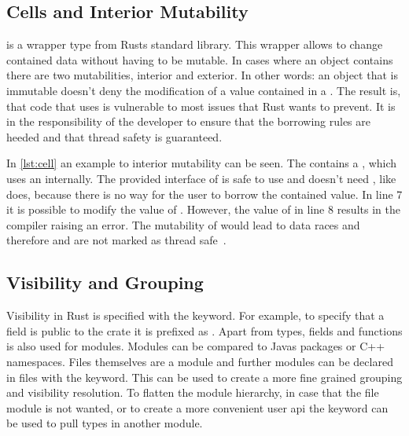 \documentclass[thesis]{subfiles}
\begin{document}
  \subsection{Cells and Interior Mutability}\label{sec:cell}
    \UnsafeCellT is a wrapper type from Rusts standard library.
    This wrapper allows to change contained data without having to be mutable.
    In cases where an object contains \UnsafeCellT there are two mutabilities, interior and exterior.
    In other words: an object that is immutable doesn't deny the modification of a value contained in a \UnsafeCellT.
    The result is, that code that uses \UnsafeCellT is vulnerable to most issues that Rust wants to prevent.
    It is in the responsibility of the developer to ensure that the borrowing rules are heeded and that thread safety is guaranteed.%
    ~\autocite[std::cell]{rust-doc}


    In \autoref{lst:cell} an example to interior mutability can be seen.
    The \struct \Foo contains a \CellT, which uses an \UnsafeCellT internally.
    The provided interface of \CellT is safe to use and doesn't need \unsafe, like \UnsafeCellT does, because there is no way for the user to borrow the contained value.
    In line 7 it is possible to modify the value of \x.
    However, the value of \y in line 8 results in the compiler raising an error.
    The mutability of \x would lead to data races and therefore \CellT and \RefCellT are not marked as thread safe~\autocites[std::cell]{rust-doc}[Send and Sync]{rust-nom}.

  \subsection{Visibility and Grouping}
    Visibility in Rust is specified with the \pub keyword.
    For example, to specify that a field is public to the crate it is prefixed as .
    Apart from types, fields and functions \pub is also used for modules.
    Modules can be compared to Javas packages or C++ namespaces.
    Files themselves are a module and further modules can be declared in files with the \mod keyword.
    This can be used to create a more fine grained grouping and visibility resolution.
    To flatten the module hierarchy, in case that the file module is not wanted, or to create a more convenient user \gls{api} the \use keyword can be used to pull types in another module.%
    ~\autocite[Visibility and Privacy, Use declarations]{rust-ref}
\end{document}
